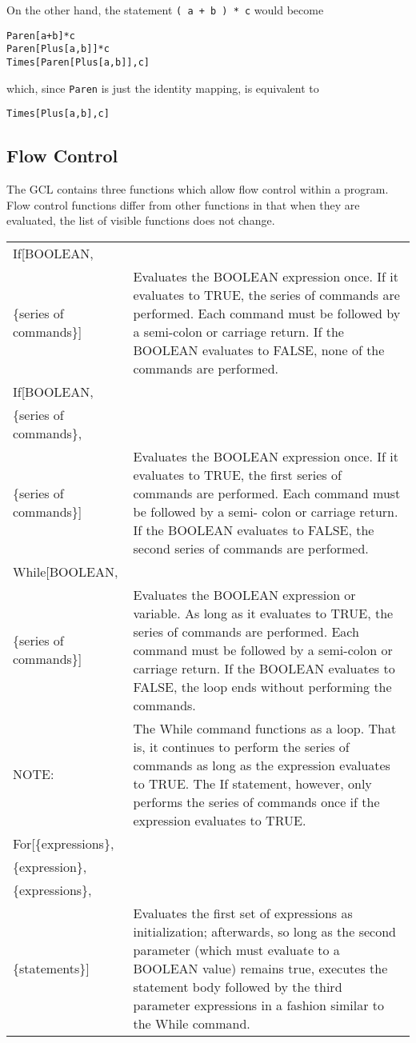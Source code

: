 \noindent
On the other hand, the statement \verb&( a + b ) * c& would become 
\begin{verbatim}
Paren[a+b]*c
Paren[Plus[a,b]]*c
Times[Paren[Plus[a,b]],c]
\end{verbatim}

\noindent
which, since \verb+Paren+ is just the identity mapping, is equivalent to
\begin{verbatim}
Times[Plus[a,b],c]
\end{verbatim}

\subsection{Flow Control}

The GCL contains three functions which allow flow control within a
program.  Flow control functions differ from other functions in that
when they are evaluated, the list of visible functions does not
change.

\medskip

\begin{tabular}{lp{4in}}
If[BOOLEAN, & \\
\{series of commands\}] & Evaluates the BOOLEAN expression
once. If it evaluates to TRUE, the series of commands are performed.
Each command must be followed by a semi-colon or carriage return.  If
the BOOLEAN evaluates to FALSE, none of the commands are performed.\\
If[BOOLEAN, & \\
\{series of commands\}, & \\
\{series of commands\}] & Evaluates the BOOLEAN expression
once. If it evaluates to TRUE, the first series of commands are
performed.  Each command must be followed by a semi- colon or carriage
return.  If the BOOLEAN evaluates to FALSE, the second series of
commands are performed. \\
While[BOOLEAN, &\\
\{series of commands\}] & Evaluates the BOOLEAN
expression or variable.  As long as it evaluates to TRUE, the series
of commands are performed.  Each command must be followed by a
semi-colon or carriage return.  If the BOOLEAN evaluates to FALSE, the
loop ends without performing the commands.\\
NOTE: & The While command functions as a
loop.  That is, it continues to perform the series of commands as long
as the expression evaluates to TRUE.  The If statement, however, only
performs the series of commands once if the expression evaluates to
TRUE.\\
For[\{expressions\}, & \\
\{expression\}, & \\
\{expressions\}, & \\
\{statements\}] & Evaluates the first set of expressions as initialization;
afterwards, so long as the second parameter (which must evaluate to a 
BOOLEAN value) remains true, executes the statement body followed by the
third parameter expressions in a fashion similar to the While command.
\end{tabular}

